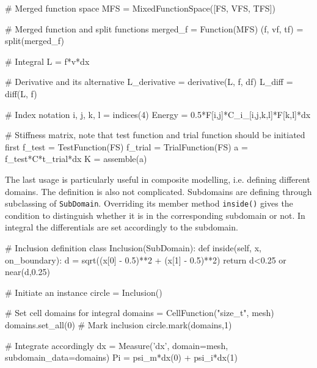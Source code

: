 \documentclass[10pt,a4paper]{scrreprt}
\begin{document}
\begin{python}
# Merged function space
MFS = MixedFunctionSpace([FS, VFS, TFS])

# Merged function and split functions
merged_f = Function(MFS)
(f, vf, tf) = split(merged_f)

# Integral
L = f*v*dx

# Derivative and its alternative
L_derivative = derivative(L, f, df)
L_diff = diff(L, f)

# Index notation
i, j, k, l = indices(4)
Energy = 0.5*F[i,j]*C_i_[i,j,k,l]*F[k,l]*dx

# Stiffness matrix, note that test function and trial function should be initiated first
f_test = TestFunction(FS)
f_trial = TrialFunction(FS)
a = f_test*C*t_trial*dx
K = assemble(a)
\end{python}

The last usage is particularly useful in composite modelling, i.e. defining different domains. The definition is also not complicated. Subdomains are defining through subclassing of \texttt{SubDomain}. Overriding its member method \texttt{inside()} gives the condition to distinguish whether it is in the corresponding subdomain or not. In integral the differentials are set accordingly to the subdomain.

\begin{python}
# Inclusion definition
class Inclusion(SubDomain):
    def inside(self, x, on_boundary):
        d = sqrt((x[0] - 0.5)**2 + (x[1] - 0.5)**2)
        return d<0.25 or near(d,0.25)

# Initiate an instance
circle = Inclusion()

# Set cell domains for integral
domains = CellFunction("size_t", mesh)
domains.set_all(0)
# Mark inclusion
circle.mark(domains,1)

# Integrate accordingly
dx = Measure('dx', domain=mesh, subdomain_data=domains)
Pi = psi_m*dx(0) + psi_i*dx(1)
\end{python}
\end{document}
